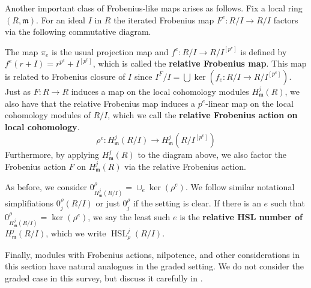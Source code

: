 \documentclass{amsproc}
\theoremstyle{definition}
\theoremstyle{remark}
\numberwithin{equation}{section}
\newcommand{\fm}{\mathfrak{m}}
\newcommand{\fbp}[1]{\left[ #1 \right]}
\newcommand{\HSL}{\operatorname{HSL}}
\begin{document}
 Another important class of Frobenius-like maps arises as follows. Fix a local ring $(R,\fm)$. For an ideal $I$ in $R$ the iterated Frobenius map $F^e : R/I\rightarrow R/I$ factors via the following commutative diagram. \begin{center}
\end{center} The map $\pi_e$ is the usual projection map and $f^e :  R/I\rightarrow R/I^{\fbp{p^e}}$ is defined by $f^e(r+I) = r^{p^e}+I^{\fbp{p^e}}$, which is called the {\bf relative Frobenius map}. This map is related to Frobenius closure of $I$ since $I^F/I = \bigcup \ker (f_e:R/I\rightarrow R/I^{\fbp{p^e}})$. Just as $F:R\rightarrow R$ induces a map on the local cohomology modules $H^j_\fm(R)$, we also have that the relative Frobenius map induces a $p^e$-linear map on the local cohomology modules of $R/I$, which we call the \textbf{relative Frobenius action on local cohomology}. \[
\rho^e : H^j_\fm\left(R/I\right)\rightarrow H^j_\fm\left(R/I^{\fbp{p^e}}\right)
\] Furthermore, by applying $H^j_\fm(R)$ to the diagram above, we also factor the Frobenius action $F$ on $H^j_\fm(R)$ via the relative Frobenius action.  
\begin{center}
\end{center} 

As before, we consider $0^\rho_{H^j_\fm(R/I)} = \cup_e\ker(\rho^e)$. We follow similar notational simplifiations $0^\rho_j(R/I)$ or just $0^\rho_j$ if the setting is clear. If there is an $e$ such that $0^\rho_{H^j_\fm(R/I)} = \ker(\rho^e)$, we say the least such $e$ is the \textbf{relative HSL number of $H^j_\fm(R/I)$}, which we write $\HSL^j_\rho(R/I)$.

Finally, modules with Frobenius actions, nilpotence, and other considerations in this section have natural analogues in the graded setting. We do not consider the graded case in this survey, but discuss it carefully in \cite{MM24}. 
\end{document}
